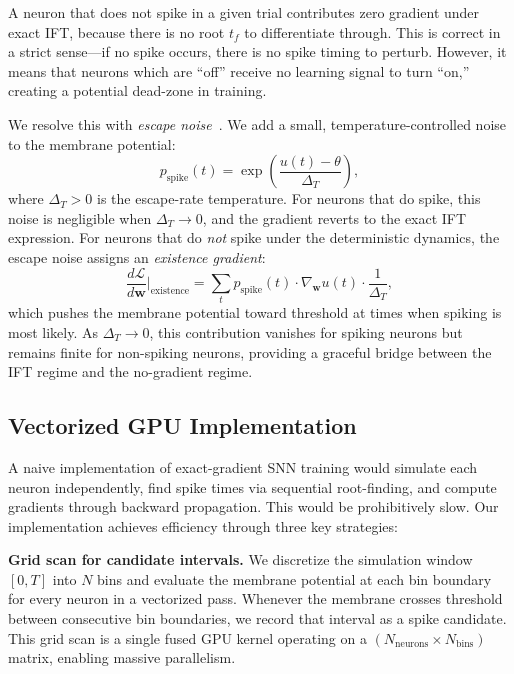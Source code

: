 \documentclass[10pt,twocolumn]{article}
\begin{document}
A neuron that does not spike in a given trial contributes zero gradient under exact IFT, because there is no root $t_f$ to differentiate through. This is correct in a strict sense---if no spike occurs, there is no spike timing to perturb. However, it means that neurons which are ``off'' receive no learning signal to turn ``on,'' creating a potential dead-zone in training.

We resolve this with \emph{escape noise}~\citep{hertz2018intro}. We add a small, temperature-controlled noise to the membrane potential:
\begin{equation}
    p_{\text{spike}}(t) = \exp\!\left(\frac{u(t) - \theta}{\Delta_T}\right),
\end{equation}
where $\Delta_T > 0$ is the escape-rate temperature. For neurons that do spike, this noise is negligible when $\Delta_T \to 0$, and the gradient reverts to the exact IFT expression. For neurons that do \emph{not} spike under the deterministic dynamics, the escape noise assigns an \emph{existence gradient}:
\begin{equation}
    \frac{d\mathcal{L}}{d\mathbf{w}} \bigg|_{\text{existence}} = \sum_{t} p_{\text{spike}}(t) \cdot \nabla_\mathbf{w} u(t) \cdot \frac{1}{\Delta_T},
    \label{eq:existence}
\end{equation}
which pushes the membrane potential toward threshold at times when spiking is most likely. As $\Delta_T \to 0$, this contribution vanishes for spiking neurons but remains finite for non-spiking neurons, providing a graceful bridge between the IFT regime and the no-gradient regime.

\subsection{Vectorized GPU Implementation}

A naive implementation of exact-gradient SNN training would simulate each neuron independently, find spike times via sequential root-finding, and compute gradients through backward propagation. This would be prohibitively slow. Our implementation achieves efficiency through three key strategies:

\textbf{Grid scan for candidate intervals.} We discretize the simulation window $[0, T]$ into $N$ bins and evaluate the membrane potential at each bin boundary for every neuron in a vectorized pass. Whenever the membrane crosses threshold between consecutive bin boundaries, we record that interval as a spike candidate. This grid scan is a single fused GPU kernel operating on a $(N_{\text{neurons}} \times N_{\text{bins}})$ matrix, enabling massive parallelism.
\end{document}
